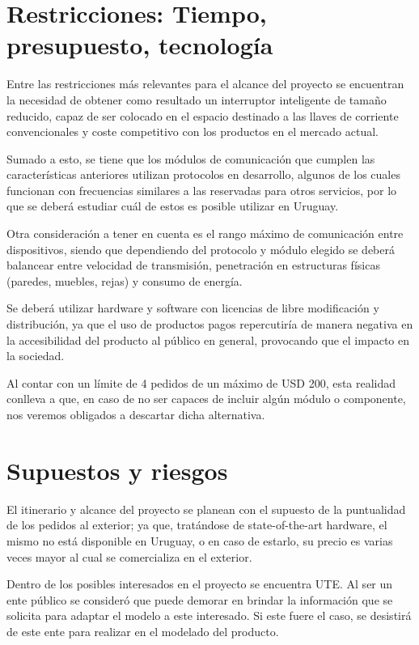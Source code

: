 \section{Restricciones: Tiempo, presupuesto, tecnología}

Entre las restricciones más relevantes para el alcance del proyecto se encuentran la necesidad de obtener como resultado un interruptor inteligente de tamaño reducido, capaz de ser colocado en el espacio destinado a las llaves de corriente convencionales y coste competitivo con los productos en el mercado actual. 

Sumado a esto, se tiene que los módulos de comunicación que cumplen las características anteriores utilizan protocolos en desarrollo, algunos de los cuales funcionan con frecuencias similares a las reservadas para otros servicios, por lo que se deberá estudiar cuál de estos es posible utilizar en Uruguay.

Otra consideración a tener en cuenta es el rango máximo de comunicación entre dispositivos, siendo que dependiendo del protocolo y módulo elegido se deberá balancear entre velocidad de transmisión, penetración en estructuras físicas (paredes, muebles, rejas) y consumo de energía.

Se deberá utilizar hardware y software con licencias de libre modificación y distribución, ya que el uso de productos pagos repercutiría de manera negativa en la accesibilidad del producto al público en general, provocando que el impacto en la sociedad.

Al contar con un límite de 4 pedidos de un máximo de USD 200, esta realidad conlleva a que, en caso de no ser capaces de incluir algún módulo o componente, nos veremos obligados a descartar dicha alternativa.

\section{Supuestos y riesgos}

El itinerario y alcance del proyecto se planean con el supuesto de la puntualidad de los pedidos al exterior; ya que, tratándose de state-of-the-art hardware, el mismo no está disponible en Uruguay, o en caso de estarlo, su precio es varias veces mayor al cual se comercializa en el exterior. 

Dentro de los posibles interesados en el proyecto se encuentra UTE. Al ser un ente público se consideró que puede demorar en brindar la información que se solicita para adaptar el modelo a este interesado. Si este fuere el caso, se desistirá de este ente para realizar en el modelado del producto.


